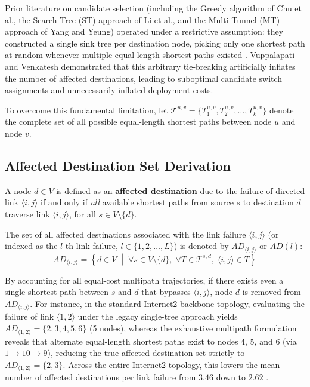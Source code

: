 Prior literature on candidate selection (including the Greedy algorithm of Chu et al., the Search Tree (ST) approach of Li et al., and the Multi-Tunnel (MT) approach of Yang and Yeung) operated under a restrictive assumption: they constructed a single sink tree per destination node, picking only one shortest path at random whenever multiple equal-length shortest paths existed \cite{vuppalapati2022minimum}. Vuppalapati and Venkatesh \cite{vuppalapati2022minimum} demonstrated that this arbitrary tie-breaking artificially inflates the number of affected destinations, leading to suboptimal candidate switch assignments and unnecessarily inflated deployment costs.

To overcome this fundamental limitation, let $\mathcal{T}^{u, v} = \{T_1^{u, v}, T_2^{u, v}, \dots, T_k^{u, v}\}$ denote the complete set of all possible equal-length shortest paths between node $u$ and node $v$. 

\subsection{Affected Destination Set Derivation}
\begin{definition}
A node $d \in V$ is defined as an \textbf{affected destination} due to the failure of directed link $\langle i, j \rangle$ if and only if \textit{all} available shortest paths from source $s$ to destination $d$ traverse link $\langle i, j \rangle$, for all $s \in V \setminus \{d\}$.
\end{definition}

The set of all affected destinations associated with the link failure $\langle i, j \rangle$ (or indexed as the $l$-th link failure, $l \in \{1, 2, \dots, L\}$) is denoted by $AD_{\langle i, j \rangle}$ or $AD(l)$:
\begin{equation}
    AD_{\langle i, j \rangle} = \left\{ d \in V \;\middle|\; \forall s \in V \setminus \{d\}, \; \forall T \in \mathcal{T}^{s, d}, \; \langle i, j \rangle \in T \right\}
\end{equation}

By accounting for all equal-cost multipath trajectories, if there exists even a single shortest path between $s$ and $d$ that bypasses $\langle i, j \rangle$, node $d$ is removed from $AD_{\langle i, j \rangle}$. For instance, in the standard Internet2 backbone topology, evaluating the failure of link $\langle 1, 2 \rangle$ under the legacy single-tree approach yields $AD_{\langle 1, 2 \rangle} = \{2, 3, 4, 5, 6\}$ (5 nodes), whereas the exhaustive multipath formulation reveals that alternate equal-length shortest paths exist to nodes 4, 5, and 6 (via $1 \to 10 \to 9$), reducing the true affected destination set strictly to $AD_{\langle 1, 2 \rangle} = \{2, 3\}$. Across the entire Internet2 topology, this lowers the mean number of affected destinations per link failure from $3.46$ down to $2.62$ \cite{vuppalapati2022minimum}.

